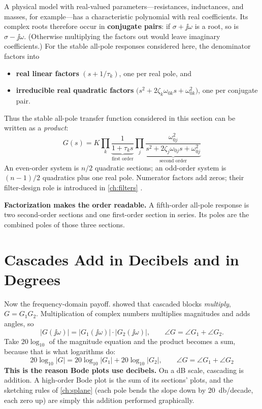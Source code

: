 A physical model with real-valued parameters---resistances, inductances, and
masses, for example---has a characteristic polynomial with real coefficients. Its
complex roots therefore occur in \textbf{conjugate pairs}: if
\(\sigma+\jj\omega\) is a root, so is \(\sigma-\jj\omega\). (Otherwise multiplying the
factors out would leave imaginary coefficients.) For the stable all-pole responses
considered here, the denominator factors into
\begin{itemize}
\item \textbf{real linear factors} \((s+1/\tau_k)\), one per real pole, and
\item \textbf{irreducible real quadratic factors}
\(\bigl(s^2+2\zeta_k\omega_{0k}s+\omega_{0k}^2\bigr)\), one per conjugate pair.
\end{itemize}
Thus the stable all-pole transfer function considered in this section can be written
as a \emph{product}:
\[
\boxed{\;
G(s)=K\prod_k\underbrace{\frac{1}{1+\tau_ks}}_{\text{first order}}
\prod_j\underbrace{\frac{\omega_{0j}^2}{s^2+2\zeta_j\omega_{0j}s+\omega_{0j}^2}}_{\text{second order}} \;}
\]
An even-order system is \(n/2\) quadratic sections; an odd-order system is
\((n-1)/2\) quadratics plus one real pole. Numerator factors add zeros; their
filter-design role is introduced in \cref{ch:filters}
\cite[pp.~32--35, 42--44]{leigh2012control}.

\begin{controlsbox}
\textbf{Factorization makes the order readable.} A fifth-order all-pole response is
two second-order sections and one first-order section in series. Its poles are the
combined poles of those three sections.
\end{controlsbox}

\section{Cascades Add in Decibels and in Degrees}
\label{sec:cascadeadd}
Now the frequency-domain payoff.  showed that cascaded blocks
\emph{multiply}, \(G=G_1G_2\). Multiplication of complex numbers multiplies magnitudes
and adds angles, so
\[
|G(\jj\omega)|=|G_1(\jj\omega)|\cdot|G_2(\jj\omega)|,
\qquad
\angle G=\angle G_1+\angle G_2 .
\]
Take \(20\log_{10}\) of the magnitude equation and the product becomes a sum, because
that is what logarithms do:
\[
\boxed{\;
20\log_{10}|G|=20\log_{10}|G_1|+20\log_{10}|G_2|,
\qquad
\angle G=\angle G_1+\angle G_2 \;}
\]
\cite[pp.~48--61]{leigh2012control}
\textbf{This is the reason Bode plots use decibels.} On a dB scale, cascading is
addition. A high-order Bode plot is the sum of its sections' plots, and the sketching
rules of \cref{ch:splane} (each pole bends the slope down by
\SI{20}{\decibel}/decade, each zero up) are simply this addition performed
graphically.

